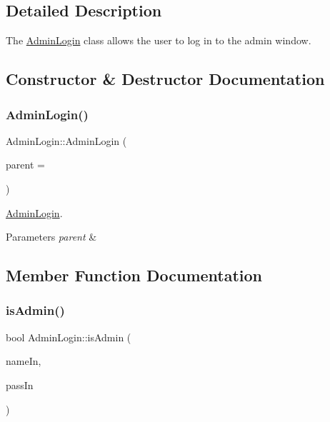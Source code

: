 \subsection{Detailed Description}
The \hyperlink{class_admin_login}{Admin\+Login} class allows the user to log in to the admin window. 

\subsection{Constructor \& Destructor Documentation}
\mbox{\label{class_admin_login_a3e1c90c550d6d7abf2a58c4919e80461}} 
\subsubsection{\texorpdfstring{Admin\+Login()}{AdminLogin()}}
{\footnotesize\ttfamily Admin\+Login\+::\+Admin\+Login (\begin{DoxyParamCaption}\item[{Q\+Widget $\ast$}]{parent = {} }\end{DoxyParamCaption})\hspace{0.3cm}{\ttfamily [explicit]}}



\hyperlink{class_admin_login}{Admin\+Login}. 


\begin{DoxyParams}{Parameters}
{\em parent} & \\
\hline
\end{DoxyParams}


\subsection{Member Function Documentation}
\mbox{\label{class_admin_login_a7b096251d552fafeae34a229e748398c}} 
\subsubsection{\texorpdfstring{is\+Admin()}{isAdmin()}}
{\footnotesize\ttfamily bool Admin\+Login\+::is\+Admin (\begin{DoxyParamCaption}\item[{Q\+String}]{name\+In,  }\item[{Q\+String}]{pass\+In }\end{DoxyParamCaption})}



